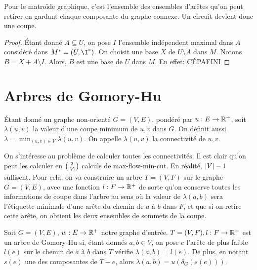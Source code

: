 \documentclass[math, info]{cours}
\begin{document}
Pour le matroïde graphique, c'est l'ensemble des ensembles d'arêtes qu'on peut retirer en gardant chaque composante du graphe connexe.
Un circuit devient donc une coupe.

\begin{proof}
	Étant donné $A \subseteq U$, on pose $I$ l'ensemble indépendent maximal dans $A$ considéré dans $M^{*} = \left(U, \I^{*}\right)$.
	On choisit une base $X$ de $U \setminus A$ dans $M$.
	Notons $B = X + A \setminus I$.
	Alors, $B$ est une base de $U$ dans $M$.
	En effet: CÉPAFINI
\end{proof}

\section{Arbres de Gomory-Hu}
\begin{definition}
	Étant donné un graphe non-orienté $G = \left(V, E\right)$, pondéré par $u: E\to \mathbb{R}^{+}$, soit $\lambda(u, v)$ la valeur d'une coupe minimum de $u, v$ dans $G$.
	On définit aussi $\lambda = \min_{(u, v) \in V} \lambda(u, v)$.
	On appelle $\lambda(u, v)$ la connectivité de $u, v$.
	\label{def:connectivité}
\end{definition}

On s'intéresse au problème de calculer toutes les connectivités. Il est clair qu'on peut les calculer en $\binom{2}{\left|V\right|}$ calculs de max-flow-min-cut.
En réalité, $\left|V\right| - 1$ suffisent.
Pour celà, on va construire un arbre $T = (V, F)$ sur le graphe $G = (V, E)$, avec une fonction $l : F \to \mathbb{R}^{+}$ de sorte qu'on conserve toutes les informations de coupe dans l'arbre au sens où la valeur de $\lambda(a, b)$ sera l'étiquette minimale d'une arête du chemin de $a$ à $b$ dans $F$, et que si on retire cette arête, on obtient les deux ensembles de sommets de la coupe.

\begin{definition}
	Soit $G = (V, E)$, $w : E \to \mathbb{R}^{+}$ notre graphe d'entrée.
	$T = (V, F), l: F \to \mathbb{R}^{+}$ est un arbre de Gomory-Hu si, étant donnés $a, b \in V$, on pose $e$ l'arête de plus faible $l(e)$ sur le chemin de $a$ à $b$ dans $T$ vérifie $\lambda(a, b) = l(e)$.
	De plus, en notant $s(e)$ une des composantes de $T - e$, alors $\lambda(a, b) = u(\delta_{G}(s(e)))$.
	\label{def:gomoryhu}
\end{definition}
\end{document}
